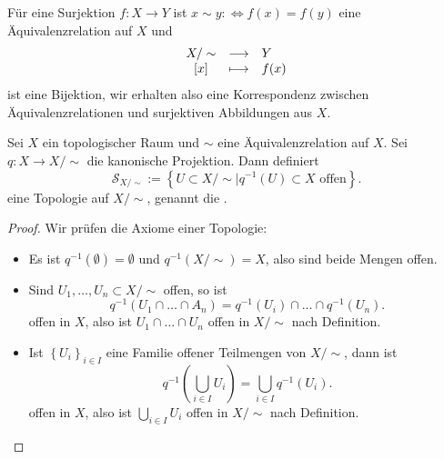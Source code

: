  \begin{recap}
     Für eine Surjektion $f: X \to  Y$ ist $x\sim y :\iff  f(x) = f(y)$ eine Äquivalenzrelation auf $X$ und
             \begin{equation*}
             \begin{array}{c c l} 
             X / \sim  & \longrightarrow & Y \\
             \left[x\right] & \longmapsto &  f(x)
             \end{array}
         \end{equation*}
ist eine Bijektion, wir erhalten also eine Korrespondenz zwischen Äquivalenzrelationen und surjektiven Abbildungen aus $X$.
\end{recap}

\begin{theoremdef}[Quotiententopologie]\label{def:quotiententopologie}
    Sei $X$ ein topologischer Raum und  $\sim $ eine Äquivalenzrelation auf $X$. Sei  $q: X \to  X / \sim $ die kanonische Projektion. Dann definiert
    \[
        \mathcal{S}_{X / \sim } := \left \{U\subset X / \sim \mid  q^{-1}(U) \subset X \text{ offen}\right\} 
    .\] 
    eine Topologie auf $X / \sim $, genannt die . 
\end{theoremdef}
\begin{proof}
    Wir prüfen die Axiome einer Topologie:
    \begin{itemize}
        \item Es ist $q^{-1}(\emptyset) = \emptyset$ und $q^{-1}(X / \sim ) = X$, also sind beide Mengen offen.
        \item Sind $U_1, \ldots,U_n\subset X / \sim $ offen, so ist
            \[
                q^{-1}(U_1\cap \ldots \cap A_n) = q^{-1}(U_i) \cap \ldots \cap q^{-1}(U_n)
            .\] 
            offen in $X$, also ist  $U_1\cap \ldots \cap U_n$ offen in $X / \sim $ nach Definition.
        \item Ist $\left \{U_i\right\} _{i\in I}$ eine Familie offener Teilmengen von $X / \sim $, dann ist
            \[
                q^{-1}\left( \bigcup_{i \in  I} U_i \right) = \bigcup_{i \in I} q^{-1}(U_i)
            .\] 
            offen in $X$, also ist  $\bigcup_{i \in I} U_i$ offen in $X / \sim $ nach Definition.
    \end{itemize}
\end{proof}






